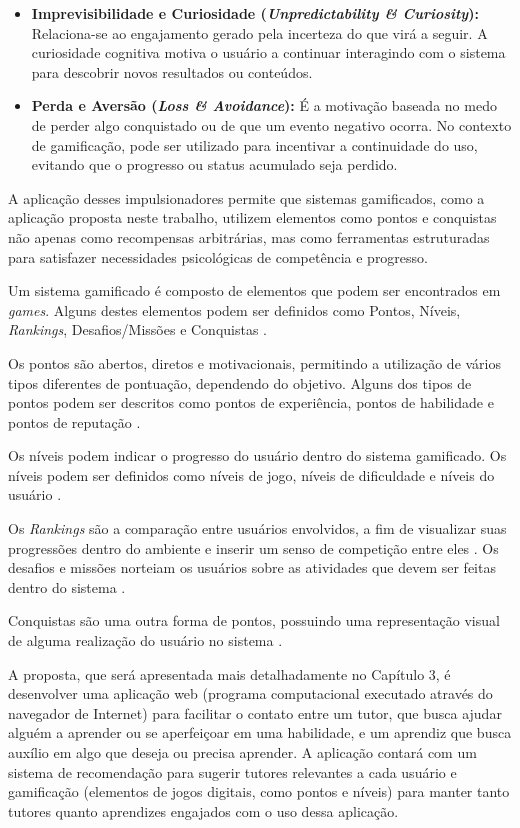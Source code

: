 \begin{itemize}
    \item \textbf{Imprevisibilidade e Curiosidade (\textit{Unpredictability \& Curiosity}):} Relaciona-se ao engajamento gerado pela incerteza do que virá a seguir. A curiosidade cognitiva motiva o usuário a continuar interagindo com o sistema para descobrir novos resultados ou conteúdos.

    \item \textbf{Perda e Aversão (\textit{Loss \& Avoidance}):} É a motivação baseada no medo de perder algo conquistado ou de que um evento negativo ocorra. No contexto de gamificação, pode ser utilizado para incentivar a continuidade do uso, evitando que o progresso ou status acumulado seja perdido.
\end{itemize}

A aplicação desses impulsionadores permite que sistemas gamificados, como a aplicação proposta neste trabalho, utilizem elementos como pontos e conquistas não apenas como recompensas arbitrárias, mas como ferramentas estruturadas para satisfazer necessidades psicológicas de competência e progresso.

Um sistema gamificado é composto de elementos que podem ser encontrados em \textit{games}. Alguns destes elementos podem ser definidos como Pontos, Níveis, \textit{Rankings}, Desafios/Missões e Conquistas \cite{klock2014gamificacaoAVA}.

Os pontos são abertos, diretos e motivacionais, permitindo a utilização de vários tipos diferentes de pontuação, dependendo do objetivo. Alguns dos tipos de pontos podem ser descritos como pontos de experiência, pontos de habilidade e pontos de reputação \cite{zichermann2011gamificacao}.

Os níveis podem indicar o progresso do usuário dentro do sistema gamificado. Os níveis podem ser definidos como níveis de jogo, níveis de dificuldade e níveis do usuário \cite{zichermann2011gamificacao}.

Os \textit{Rankings} são a comparação entre usuários envolvidos, a fim de visualizar suas progressões dentro do ambiente e inserir um senso de competição entre eles \cite{klock2014gamificacaoAVA}. Os desafios e missões norteiam os usuários sobre as atividades que devem ser feitas dentro do sistema \cite{fadel2014gamificacao}.

Conquistas são uma outra forma de pontos, possuindo uma representação visual de alguma realização do usuário no sistema \cite{hunter2012gamificacao}.

A proposta, que será apresentada mais detalhadamente no Capítulo 3, é desenvolver uma aplicação web (programa computacional executado através do navegador de Internet) para facilitar o contato entre um tutor, que busca ajudar alguém a aprender ou se aperfeiçoar em uma habilidade, e um aprendiz que busca auxílio em algo que deseja ou precisa aprender. A aplicação contará com um sistema de recomendação para sugerir tutores relevantes a cada usuário e gamificação (elementos de jogos digitais, como pontos e níveis) para manter tanto tutores quanto aprendizes engajados com o uso dessa aplicação.

